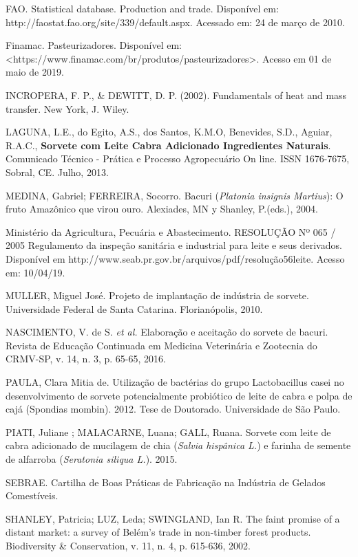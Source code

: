 \documentclass[10pt,a4paper]{article}
\begin{document}
\begin{thebibliography}{}
 FAO. Statistical database. Production and trade. Disponível em: http://faostat.fao.org/site/339/default.aspx. Acessado
em: 24 de março de 2010.

 Finamac. Pasteurizadores. Disponível em: <https://www.finamac.com/br/produtos/pasteurizadores>. Acesso em 01 de maio de 2019.

 INCROPERA, F. P., & DEWITT, D. P. (2002). Fundamentals of heat and mass transfer. New York, J. Wiley.

 LAGUNA, L.E., do Egito, A.S., dos Santos, K.M.O, Benevides, S.D., Aguiar, R.A.C., \textbf{Sorvete com Leite Cabra Adicionado Ingredientes Naturais}. Comunicado Técnico - Prática e Processo Agropecuário On line. ISSN 1676-7675, Sobral, CE. Julho, 2013.

 MEDINA, Gabriel; FERREIRA, Socorro. Bacuri (\textit{Platonia insignis Martius}): O fruto Amazônico que virou ouro. Alexiades, MN y Shanley, P.(eds.), 2004.

  Ministério da Agricultura, Pecuária e Abastecimento. RESOLUÇÃO Nº 065 / 2005 Regulamento da inspeção sanitária e industrial
para leite e seus derivados. Disponível em http://www.seab.pr.gov.br/arquivos/pdf/resolução56leite. Acesso em: 10/04/19.

 MULLER, Miguel José. Projeto de implantação de indústria de sorvete.  Universidade Federal de Santa Catarina. Florianópolis, 2010.

 NASCIMENTO, V. de S. \textit{et al.} Elaboração e aceitação do sorvete de bacuri. Revista de Educação Continuada em Medicina Veterinária e Zootecnia do CRMV-SP, v. 14, n. 3, p. 65-65, 2016.

 PAULA, Clara Mitia de. Utilização de bactérias do grupo Lactobacillus casei no desenvolvimento de sorvete potencialmente probiótico de leite de cabra e polpa de cajá (Spondias mombin). 2012. Tese de Doutorado. Universidade de São Paulo.

 PIATI, Juliane ; MALACARNE, Luana; GALL, Ruana. Sorvete com leite de cabra adicionado de mucilagem de chia (\textit{Salvia hispânica L.}) e farinha de semente de alfarroba (\textit{Seratonia siliqua L.}). 2015.

 SEBRAE. Cartilha de Boas Práticas de Fabricação na Indústria de Gelados Comestíveis.

 SHANLEY, Patricia; LUZ, Leda; SWINGLAND, Ian R. The faint promise of a distant market: a survey of Belém's trade in non-timber forest products. Biodiversity \& Conservation, v. 11, n. 4, p. 615-636, 2002.


\end{thebibliography}
\end{document}
